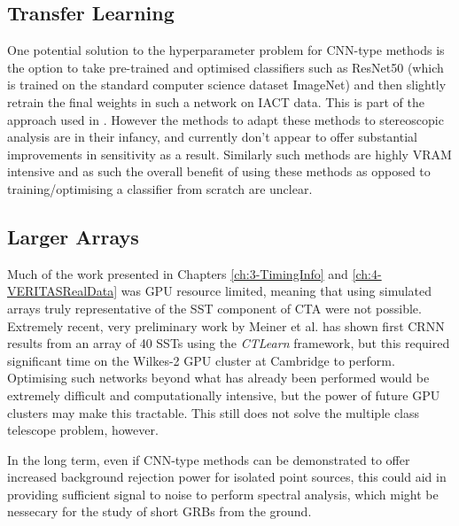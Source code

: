 \subsection{Transfer Learning}
One potential solution to the hyperparameter problem for CNN-type methods is the option to take pre-trained and optimised classifiers such as ResNet50 \cite{resnet50} (which is trained on the standard computer science dataset ImageNet) and then slightly retrain the final weights in such a network on IACT data. This is part of the approach used in \cite{tjarkicrc}. However the methods to adapt these methods to stereoscopic analysis are in their infancy, and currently don't appear to offer substantial improvements in sensitivity as a result. Similarly such methods are highly VRAM intensive and as such the overall benefit of using these methods as opposed to training/optimising a classifier from scratch are unclear.


\subsection{Larger Arrays}
Much of the work presented in Chapters \ref{ch:3-TimingInfo} and \ref{ch:4-VERITASRealData} was GPU resource limited, meaning that using simulated arrays truly representative of the SST component of CTA were not possible. Extremely recent, very preliminary work by Meiner et al. \cite{tjarkicrc} has shown first CRNN results from an array of 40 SSTs using the \textit{CTLearn} framework, but this required significant time on the Wilkes-2 GPU cluster at Cambridge to perform. Optimising such networks beyond what has already been performed would be extremely difficult and computationally intensive, but the power of future GPU clusters may make this tractable. This still does not solve the multiple class telescope problem, however.

In the long term, even if CNN-type methods can be demonstrated to offer increased background rejection power for isolated point sources, this could aid in providing sufficient signal to noise to perform spectral analysis, which might be nessecary for the study of short GRBs from the ground.